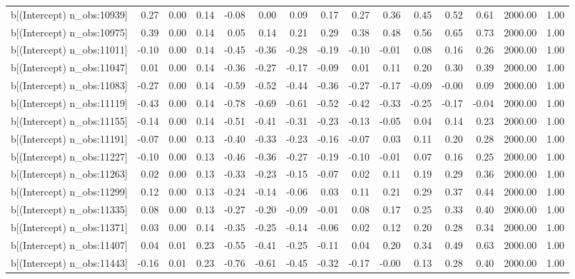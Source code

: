 \begin{table}[ht]
\begin{tabular}{rrrrrrrrrrrrrrr}
  b[(Intercept) n\_obs:10939] & 0.27 & 0.00 & 0.14 & -0.08 & 0.00 & 0.09 & 0.17 & 0.27 & 0.36 & 0.45 & 0.52 & 0.61 & 2000.00 & 1.00 \\ 
  b[(Intercept) n\_obs:10975] & 0.39 & 0.00 & 0.14 & 0.05 & 0.14 & 0.21 & 0.29 & 0.38 & 0.48 & 0.56 & 0.65 & 0.73 & 2000.00 & 1.00 \\ 
  b[(Intercept) n\_obs:11011] & -0.10 & 0.00 & 0.14 & -0.45 & -0.36 & -0.28 & -0.19 & -0.10 & -0.01 & 0.08 & 0.16 & 0.26 & 2000.00 & 1.00 \\ 
  b[(Intercept) n\_obs:11047] & 0.01 & 0.00 & 0.14 & -0.36 & -0.27 & -0.17 & -0.09 & 0.01 & 0.11 & 0.20 & 0.30 & 0.39 & 2000.00 & 1.00 \\ 
  b[(Intercept) n\_obs:11083] & -0.27 & 0.00 & 0.14 & -0.59 & -0.52 & -0.44 & -0.36 & -0.27 & -0.17 & -0.09 & -0.00 & 0.09 & 2000.00 & 1.00 \\ 
  b[(Intercept) n\_obs:11119] & -0.43 & 0.00 & 0.14 & -0.78 & -0.69 & -0.61 & -0.52 & -0.42 & -0.33 & -0.25 & -0.17 & -0.04 & 2000.00 & 1.00 \\ 
  b[(Intercept) n\_obs:11155] & -0.14 & 0.00 & 0.14 & -0.51 & -0.41 & -0.31 & -0.23 & -0.13 & -0.05 & 0.04 & 0.14 & 0.23 & 2000.00 & 1.00 \\ 
  b[(Intercept) n\_obs:11191] & -0.07 & 0.00 & 0.13 & -0.40 & -0.33 & -0.23 & -0.16 & -0.07 & 0.03 & 0.11 & 0.20 & 0.28 & 2000.00 & 1.00 \\ 
  b[(Intercept) n\_obs:11227] & -0.10 & 0.00 & 0.13 & -0.46 & -0.36 & -0.27 & -0.19 & -0.10 & -0.01 & 0.07 & 0.16 & 0.25 & 2000.00 & 1.00 \\ 
  b[(Intercept) n\_obs:11263] & 0.02 & 0.00 & 0.13 & -0.33 & -0.23 & -0.15 & -0.07 & 0.02 & 0.11 & 0.19 & 0.29 & 0.36 & 2000.00 & 1.00 \\ 
  b[(Intercept) n\_obs:11299] & 0.12 & 0.00 & 0.13 & -0.24 & -0.14 & -0.06 & 0.03 & 0.11 & 0.21 & 0.29 & 0.37 & 0.44 & 2000.00 & 1.00 \\ 
  b[(Intercept) n\_obs:11335] & 0.08 & 0.00 & 0.13 & -0.27 & -0.20 & -0.09 & -0.01 & 0.08 & 0.17 & 0.25 & 0.33 & 0.40 & 2000.00 & 1.00 \\ 
  b[(Intercept) n\_obs:11371] & 0.03 & 0.00 & 0.14 & -0.35 & -0.25 & -0.14 & -0.06 & 0.02 & 0.12 & 0.20 & 0.28 & 0.34 & 2000.00 & 1.00 \\ 
  b[(Intercept) n\_obs:11407] & 0.04 & 0.01 & 0.23 & -0.55 & -0.41 & -0.25 & -0.11 & 0.04 & 0.20 & 0.34 & 0.49 & 0.63 & 2000.00 & 1.00 \\ 
  b[(Intercept) n\_obs:11443] & -0.16 & 0.01 & 0.23 & -0.76 & -0.61 & -0.45 & -0.32 & -0.17 & -0.00 & 0.13 & 0.28 & 0.40 & 2000.00 & 1.00 \\ 

\end{tabular}
\end{table}
